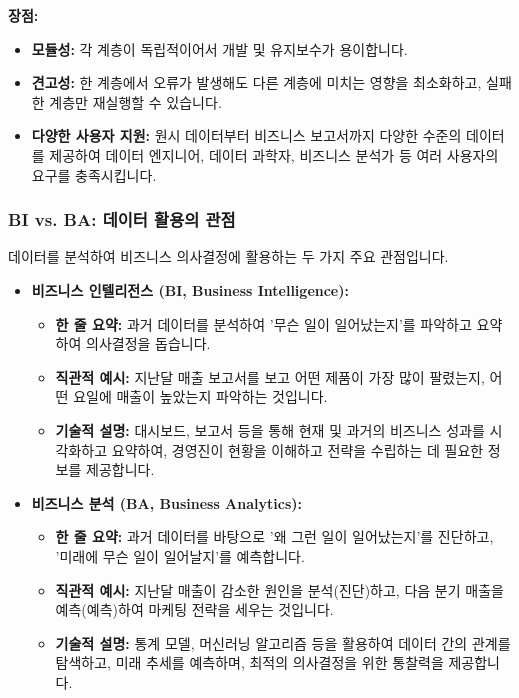 \documentclass[11pt,a4paper]{article}
\begin{document}
\begin{itemize}
\begin{itemize}
        \textbf{장점:}
        \begin{itemize}
            \item \textbf{모듈성:} 각 계층이 독립적이어서 개발 및 유지보수가 용이합니다.
            \item \textbf{견고성:} 한 계층에서 오류가 발생해도 다른 계층에 미치는 영향을 최소화하고, 실패한 계층만 재실행할 수 있습니다.
            \item \textbf{다양한 사용자 지원:} 원시 데이터부터 비즈니스 보고서까지 다양한 수준의 데이터를 제공하여 데이터 엔지니어, 데이터 과학자, 비즈니스 분석가 등 여러 사용자의 요구를 충족시킵니다.
        \end{itemize}
    \end{itemize}
\end{itemize}

\subsubsection*{BI vs. BA: 데이터 활용의 관점}
데이터를 분석하여 비즈니스 의사결정에 활용하는 두 가지 주요 관점입니다.
\begin{itemize}
    \item \textbf{비즈니스 인텔리전스 (BI, Business Intelligence):}
    \begin{itemize}
        \item \textbf{한 줄 요약:} 과거 데이터를 분석하여 '무슨 일이 일어났는지'를 파악하고 요약하여 의사결정을 돕습니다.
        \item \textbf{직관적 예시:} 지난달 매출 보고서를 보고 어떤 제품이 가장 많이 팔렸는지, 어떤 요일에 매출이 높았는지 파악하는 것입니다.
        \item \textbf{기술적 설명:} 대시보드, 보고서 등을 통해 현재 및 과거의 비즈니스 성과를 시각화하고 요약하여, 경영진이 현황을 이해하고 전략을 수립하는 데 필요한 정보를 제공합니다.
    \end{itemize}
    \item \textbf{비즈니스 분석 (BA, Business Analytics):}
    \begin{itemize}
        \item \textbf{한 줄 요약:} 과거 데이터를 바탕으로 '왜 그런 일이 일어났는지'를 진단하고, '미래에 무슨 일이 일어날지'를 예측합니다.
        \item \textbf{직관적 예시:} 지난달 매출이 감소한 원인을 분석(진단)하고, 다음 분기 매출을 예측(예측)하여 마케팅 전략을 세우는 것입니다.
        \item \textbf{기술적 설명:} 통계 모델, 머신러닝 알고리즘 등을 활용하여 데이터 간의 관계를 탐색하고, 미래 추세를 예측하며, 최적의 의사결정을 위한 통찰력을 제공합니다.
    \end{itemize}
\end{itemize}
\end{document}
